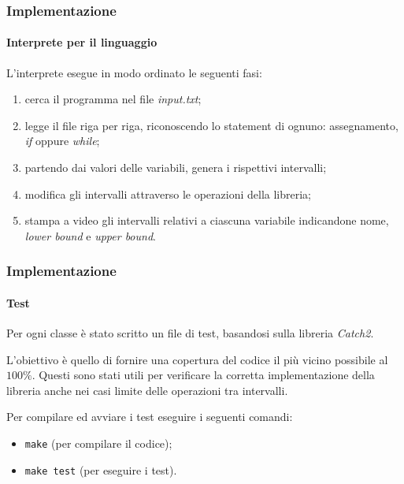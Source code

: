 \documentclass{beamer}
\begin{document}
	\begin{frame}[fragile]
		\frametitle{Implementazione}
		\framesubtitle{Interprete per il linguaggio}
		L'interprete esegue in modo ordinato le seguenti fasi:
		\begin{enumerate}
			\item \alert{cerca} il programma nel file \textit{input.txt};
			\item \alert{legge} il file riga per riga, riconoscendo lo \alert{statement} di ognuno: assegnamento, \textit{if} oppure \textit{while};
			\item partendo dai valori delle variabili, genera i rispettivi \alert{intervalli};
			\item modifica gli intervalli attraverso le \alert{operazioni} della libreria;
			\item \alert{stampa} a video gli intervalli relativi a ciascuna variabile indicandone nome, \textit{lower bound} e \textit{upper bound}.
		\end{enumerate}	
\end{frame}

	\begin{frame}[fragile]
		\frametitle{Implementazione}
		\framesubtitle{Test}
		Per ogni classe è stato scritto un file di \alert{test}, basandosi sulla libreria \textit{Catch2}.
	
		\bigskip
		L'obiettivo è quello di fornire una \alert{copertura} del codice il più vicino possibile al $100\%$.
		Questi sono stati utili per verificare la corretta implementazione della libreria anche nei casi limite delle operazioni tra intervalli.

		\bigskip
		Per compilare ed avviare i test eseguire i seguenti comandi:
		\begin{itemize}
			\item \verb|make| (per compilare il codice);
			\item \verb|make test| (per eseguire i test).
		\end{itemize}

\end{frame}
\end{document}
